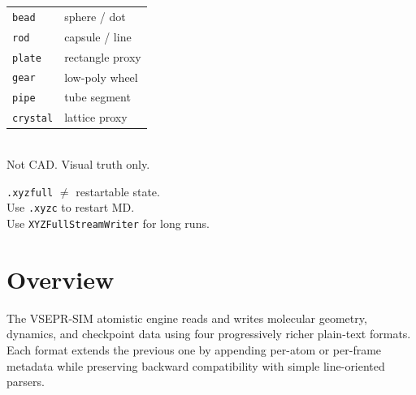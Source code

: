 \documentclass[12pt, a4paper, oneside]{article}
\begin{document}
\begin{tcolorbox}
\begin{multicols}{2}
\medskip
\begin{tcolorbox}[
  colback=white, colframe=rulegray,
  boxrule=0.7pt, arc=3pt, left=4pt, right=4pt, top=3pt, bottom=3pt,
  title={\bfseries\small CG Proxy Shapes},
  fonttitle=\small\bfseries, attach title to upper, after title={\\[2pt]}
]
\small
\begin{tabular}{ll}
\texttt{bead}    & sphere / dot \\
\texttt{rod}     & capsule / line \\
\texttt{plate}   & rectangle proxy \\
\texttt{gear}    & low-poly wheel \\
\texttt{pipe}    & tube segment \\
\texttt{crystal} & lattice proxy \\
\end{tabular}\\[4pt]
Not CAD.  Visual truth only.
\end{tcolorbox}

\medskip
\begin{tcolorbox}[
  colback=warnredlight, colframe=warnred,
  boxrule=0.7pt, arc=3pt, left=4pt, right=4pt, top=3pt, bottom=3pt,
  title={\bfseries\small NOT a checkpoint},
  fonttitle=\small\bfseries, attach title to upper, after title={\\[2pt]}
]
\small
\texttt{.xyzfull} $\neq$ restartable state.\\
Use \texttt{.xyzc} to restart MD.\\
Use \texttt{XYZFullStreamWriter} for long runs.
\end{tcolorbox}

\end{multicols}
\end{tcolorbox}

\newpage

\section{Overview}

The VSEPR-SIM atomistic engine reads and writes molecular geometry,
dynamics, and checkpoint data using four progressively richer
plain-text formats.  Each format extends the previous one by appending
per-atom or per-frame metadata while preserving backward compatibility
with simple line-oriented parsers.
\end{document}
